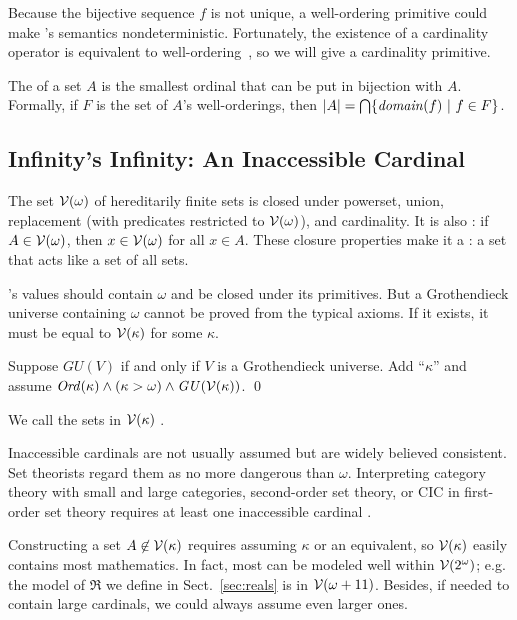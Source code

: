 Because the bijective sequence $f$ is not unique, a well-ordering primitive could make \targetlang's semantics nondeterministic.
Fortunately, the existence of a cardinality operator is equivalent to well-ordering~\cite{cit:tzouvaras-2005sl-card}, so we will give \targetlang a cardinality primitive.

The  of a set $A$ is the smallest ordinal that can be put in bijection with $A$. Formally, if $F$ is the set of $A$'s well-orderings, then $|A| = \textstyle\bigcap \lbrace {\mathit{domain}(f)} \ \lvert\ {f \in F} \rbrace$.


\subsection{Infinity's Infinity: An Inaccessible Cardinal}

The set $\mathcal{V}(\omega)$ of hereditarily finite sets is closed under powerset, union, replacement (with predicates restricted to $\mathcal{V}(\omega)$), and cardinality. It is also : if $A \in \mathcal{V}(\omega)$, then $x \in \mathcal{V}(\omega)$ for all $x \in A$. These closure properties make it a : a set that acts like a set of all sets.

\targetlang's values should contain $\omega$ and be closed under its primitives. But a Grothendieck universe containing $\omega$ cannot be proved from the typical axioms. If it exists, it must be equal to $\mathcal{V}(\kappa)$ for some  $\kappa$.
\begin{axiom}
Suppose $\mathit{GU}(V)$ if and only if $V$ is a Grothendieck universe. Add ``$\kappa$'' and assume $\mathit{Ord}(\kappa) \wedge (\kappa > \omega) \wedge \mathit{GU}(\mathcal{V}(\kappa))$.
\qed
\end{axiom}
We call the sets in $\mathcal{V}(\kappa)$ .

Inaccessible cardinals are not usually assumed but are widely believed consistent. Set theorists regard them as no more dangerous than $\omega$. Interpreting category theory with small and large categories, second-order set theory, or CIC in first-order set theory requires at least one inaccessible cardinal \cite{cit:uzquiano-1999-models-zf2,cit:barras-2010-sets-coq,cit:werner-1997-sets-types}.

Constructing a set $A \not\in \mathcal{V}(\kappa)$ requires assuming $\kappa$ or an equivalent, so $\mathcal{V}(\kappa)$ easily contains most mathematics. In fact, most can be modeled well within $\mathcal{V}(2^\omega)$; e.g. the model of $\Re$ we define in Sect.~\ref{sec:reals} is in $\mathcal{V}(\omega + 11)$. Besides, if \targetlang needed to contain large cardinals, we could always assume even larger ones.

